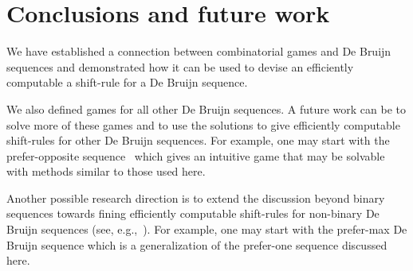 \documentclass[final,12pt]{elsarticle}
\theoremstyle{definition} \newtheorem{definition}[theorem]{Definition} \newtheorem{observation}[theorem]{Observation} \newtheorem{example}[theorem]{Example} \newtheorem{remark}[theorem]{Remark} \newtheorem{corrolary}[theorem]{Corrolary}
\begin{document}
\section{Conclusions and future work}
We have established a connection between combinatorial games and De Bruijn sequences and demonstrated how it can be used to devise an efficiently computable a shift-rule for a De Bruijn sequence.

We also defined games for all other De Bruijn sequences. A future work can be to solve more of these games and to use the solutions to give efficiently computable shift-rules for other De Bruijn sequences. For example, one may start with the prefer-opposite sequence~\cite{alhakim2010simple} which gives an intuitive game that may be solvable with methods similar to those used here.

Another possible research direction is to extend the discussion beyond binary sequences towards fining efficiently computable shift-rules for non-binary De Bruijn sequences (see, e.g.,~\cite{SAWADA2017524}). For example, one may start with the prefer-max De Bruijn sequence which is a generalization of the prefer-one sequence discussed here.  
	
	


\end{document}
